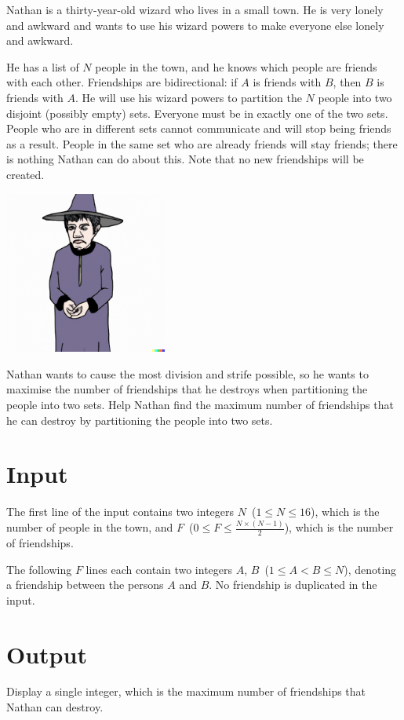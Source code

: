 
Nathan is a thirty-year-old wizard who lives in a small town. He is very lonely
and awkward and wants to use his wizard powers to make everyone else lonely and
awkward.

He has a list of $N$ people in the town, and he knows which people are friends
with each other. Friendships are bidirectional: if $A$ is friends with $B$, then $B$ is friends
with $A$. He will use his wizard powers to partition the $N$ people into
two disjoint (possibly empty) sets. Everyone must be in exactly one of the two sets. People who are in different sets cannot communicate and will stop being friends as a result. People in the same set who are already friends will stay friends; there is nothing Nathan can do about this. Note that no new friendships will be created.

\begin{center}
    \includegraphics[width=0.4\textwidth]{fig}
\end{center}


Nathan wants to cause the most division and strife possible, so he wants to
maximise the number of friendships that he destroys when partitioning the people
into two sets. Help Nathan find the maximum number of friendships that he can
destroy by partitioning the people into two sets.


\section*{Input}

The first line of the input contains two integers $N$~($1 \leq N \le
16$), which is the number of people in the town, and $F$~($0 \leq F \leq \frac{N \times (N - 1)}{2}$), which is the number of friendships.

The following $F$ lines each contain two integers $A$, $B$~($1 \leq A < B \leq
N$), denoting a friendship between the persons $A$ and $B$. No friendship is duplicated in the input.


\section*{Output}

Display a single integer, which is the maximum number of friendships that
Nathan can destroy.

